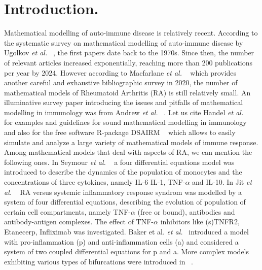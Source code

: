 \documentclass[a4paper, 12pt]{article}
\providecommand{\DIFaddtex}[1]{{\protect\color{blue} \sf #1}} %
\providecommand{\DIFdeltex}[1]{{\protect\color{red} \scriptsize #1}} %
\providecommand{\DIFaddbegin}{} %
\providecommand{\DIFaddend}{} %
\providecommand{\DIFdelbegin}{} %
\providecommand{\DIFdelend}{} %
\providecommand{\DIFadd}[1]{\texorpdfstring{\DIFaddtex{#1}}{#1}} %
\providecommand{\DIFdel}[1]{\texorpdfstring{\DIFdeltex{#1}}{}} %
\begin{document}
\section{Introduction.}
Mathematical modelling of  auto-immune disease is relatively recent.
According to the systematic survey on mathematical modelling of auto-immune disease by  Ugolkov \textit{et al.}\DIFaddbegin \DIFadd{~}\DIFaddend \cite{frontiers2024},
the ﬁrst papers date back to the 1970s. Since
then, the number of relevant articles increased exponentially,
reaching more than 200 publications per year by 2024. 
However according to Macfarlane \textit{et al.}\DIFaddbegin \DIFadd{~}\DIFaddend \cite{macfarlane2020} which provides another careful and exhaustive bibliographic survey in 2020, the number of  mathematical models of Rheumatoid Arthritis (RA) is still relatively small.
An illuminative survey paper introducing the issues and pitfalls of mathematical modelling in immunology was from Andrew \textit{et al.}\DIFaddbegin \DIFadd{~}\DIFaddend \cite{andrew}. 
Let us cite Handel \textit{et al.}\DIFaddbegin \DIFadd{~}\DIFaddend \cite{Handel2020} for  examples and guidelines for sound mathematical modelling in immunology and also for the free software R-package DSAIRM\DIFaddbegin \DIFadd{~}\DIFaddend \cite{dsairm2019} which allows to easily simulate and analyze a large variety of mathematical models of immune response.
Among mathematical models that deal with aspects
of RA, we can mention the following ones.
In Seymour \textit{et al.}\DIFaddbegin \DIFadd{~}\DIFaddend \cite{seymour2001} a four \DIFaddbegin \DIFadd{differential }\DIFaddend equations model was introduced to describe the dynamics of the population of monocytes and the concentrations of three cytokines, namely \DIFdelbegin \DIFdel{IL-6}\DIFdelend \DIFaddbegin \DIFadd{IL-1}\DIFaddend , TNF-$\alpha$ and IL-10. 
In Jit \textit{et al.}\DIFaddbegin \DIFadd{~}\DIFaddend \cite{jit2005} RA versus systemic inflammatory response syndrom was modelled by a system of four differential equations, describing the evolution of population of certain cell compartments, namely TNF-$\alpha$ (free or bound), antibodies and antibody-antigen complexes.
The effect of TNF-$\alpha$ inhibitors like (s)TNFR2, Etanecerp, Infliximab was investigated.
Baker \DIFdelbegin \DIFdel{et al.}\DIFdelend \DIFaddbegin \DIFadd{\textit{et al.}~}\DIFaddend \cite{baker2013} introduced a model with pro-inﬂammation 
(p) and anti-inﬂammation cells (a) and considered a system of two \DIFaddbegin \DIFadd{coupled }\DIFaddend differential equations for p and a. 
More complex models exhibiting various types of  bifurcations were introduced in\DIFaddbegin \DIFadd{~}\DIFaddend \cite{baker2017}. 
\end{document}
